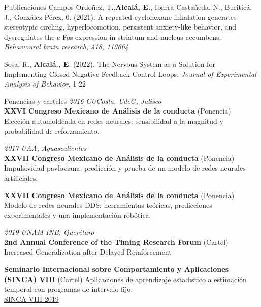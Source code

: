 \documentclass{resume} %
\begin{document}
\begin{rSection}{Publicaciones}
Campos-Ordoñez, T.,\textbf{Alcalá, E.}, Ibarra-Castañeda, N., Buriticá, J., González-Pérez, 0. (2021). A repeated cyclohexane inhalation generates stereotypic circling, hyperlocomotion, persistent anxiety-like behavior, and dysregulates the c-Fos expression in striatum and nucleus accumbens. \textit{Behavioural brain research, 418, 113664}

Sosa, R., \textbf{Alcalá., E}. (2022). The Nervous System as a Solution for Implementing Closed Negative Feedback Control Loops. \textit{Journal of Experimental Analysis of Behavior}, 1-22


\end{rSection}

\begin{rSection}{Ponencias y carteles}
{\em 2016} \hfill {\em CUCosta, UdeG, Jalisco} \\
{\bf XXVI Congreso Mexicano de Análisis de la conducta} (Ponencia) \\
Elección automoldeada en redes neurales: sensibilidad a la magnitud y probabilidad de reforzamiento. 

{\em 2017} \hfill {\em UAA, Aguascalientes} \\
{\bf XXVII Congreso Mexicano de Análisis de la conducta} (Ponencia) \\
Impulsividad pavloviana: predicción y prueba de un modelo de redes neurales artificiales. 

{\bf XXVII Congreso Mexicano de Análisis de la conducta} (Ponencia) \\ 
Modelo de redes neurales DDS: herramientas teóricas, predicciones experimentales y una implementación robótica.

{\em 2019} \hfill {\em UNAM-INB, Querétaro} \\
{\bf 2nd Annual Conference of the Timing Research Forum} (Cartel) \\
Increased Generalization after Delayed Reinforcement

{\bf Seminario Internacional sobre Comportamiento y Aplicaciones (SINCA) VIII } (Cartel)
Aplicaciones de aprendizaje estadıstico a estimación temporal con programas de intervalo fijo.\\
\href{https://www.researchgate.net/profile/Emmanuel-Alcala/publication/352672052_Aplicaciones_de_aprendizaje_estadistico_a_estimacion_temporal_con_programas_de_intervalo_fijo/links/60d29f2592851c34e07cdd31/Aplicaciones-de-aprendizaje-estadistico-a-estimacion-temporal-con-programas-de-intervalo-fijo.pdf}{SINCA VIII 2019}

\end{rSection}
\end{document}
